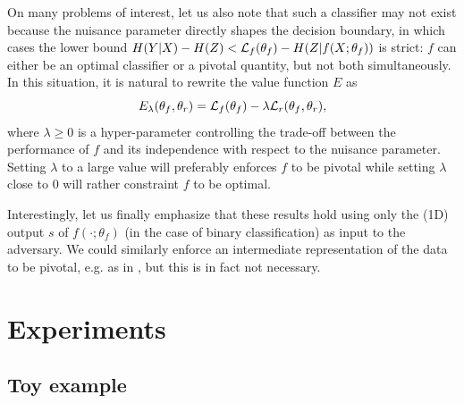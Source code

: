 \documentclass[twocolumn,superscriptaddress,aps]{revtex4-1}
\theoremstyle{plain}
\begin{document}
On many problems of interest, let us also note that such a classifier may
not exist because the nuisance parameter directly shapes the decision boundary,
in which cases the lower bound $ H({Y|X}) - H(Z) < {\cal L}_f(\theta_f) - H({Z|f(X;\theta_f)})$ is strict: $f$ can either be an optimal classifier or a
pivotal quantity, but not both simultaneously. In this situation, it is natural
to rewrite the value function $E$  as
\begin{equation}\label{eqn:vf-lambda}
    E_\lambda(\theta_f, \theta_r) = {\cal L}_f(\theta_f) - \lambda {\cal L}_r(\theta_f, \theta_r),
\end{equation}
where $\lambda \geq 0$ is a hyper-parameter controlling the trade-off between
the performance of $f$ and its independence with respect to the nuisance
parameter. Setting $\lambda$ to a large value will preferably enforces $f$ to
be pivotal while setting $\lambda$ close to $0$ will rather constraint $f$ to be
optimal.

Interestingly, let us finally emphasize that these results hold using only the (1D) output $s$
of $f(\cdot;\theta_f)$ (in the case of binary classification) as input to the adversary. We
could similarly enforce an intermediate representation of the data to be
pivotal, e.g. as in \citep{ganin2014unsupervised}, but this is in fact not
necessary.



\section{Experiments}

\subsection{Toy example}
\label{sec:toy}
\end{document}
